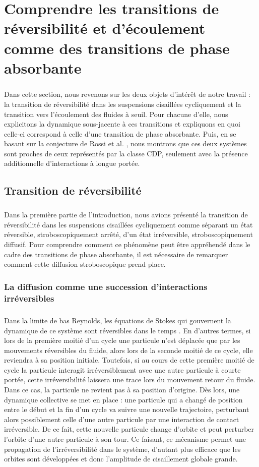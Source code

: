 \section{Comprendre les transitions de réversibilité et d'écoulement comme des transitions de phase absorbante}

\subparagraph{}Dans cette section, nous revenons sur les deux objets d'intérêt de notre travail : la transition de réversibilité dans les suspensions cisaillées cycliquement et la transition vers l'écoulement des fluides à seuil. Pour chacune d'elle, nous explicitons la dynamique sous-jacente à ces transitions et expliquons en quoi celle-ci correspond à celle d'une transition de phase absorbante. Puis, en se basant sur la conjecture de Rossi et al. \cite{rossi_universality_2000}, nous montrons que ces deux systèmes sont proches de ceux représentés par la classe CDP, seulement avec la présence additionnelle d'interactions à longue portée.

\subsection{Transition de réversibilité}

\subparagraph{}Dans la première partie de l'introduction, nous avions présenté la transition de réversibilité dans les suspensions cisaillées cycliquement comme séparant un état réversible, stroboscopiquement arrêté, d'un état irréversible, stroboscopiquement diffusif. Pour comprendre comment ce phénomène peut être appréhendé dans le cadre des transitions de phase absorbante, il est nécessaire de remarquer comment cette diffusion stroboscopique prend place.

\subsubsection{La diffusion comme une succession d'interactions irréversibles}


\subparagraph{}Dans la limite de bas Reynolds, les équations de Stokes qui gouvernent la dynamique de ce système sont réversibles dans le temps \cite{kimMicrohydrodynamicsPrinciplesSelected1991}. En d'autres termes, si lors de la première moitié d'un cycle une particule n'est déplacée que par les mouvements réversibles du fluide, alors lors de la seconde moitié de ce cycle, elle reviendra à sa position initiale. Toutefois, si au cours de cette première moitié de cycle la particule interagit irréversiblement avec une autre particule à courte portée, cette irréversibilité laissera une trace lors du mouvement retour du fluide. Dans ce cas, la particule ne revient pas à sa position d'origine. Dès lors, une dynamique collective se met en place : une particule qui a changé de position entre le début et la fin d'un cycle va suivre une nouvelle trajectoire, perturbant alors possiblement celle d'une autre particule par une interaction de contact irréversible. De ce fait, cette nouvelle particule change d'orbite et peut perturber l'orbite d'une autre particule à son tour. Ce faisant, ce mécanisme permet une propagation de l'irréversibilité dans le système, d'autant plus efficace que les orbites sont développées et donc l'amplitude de cisaillement globale grande.

